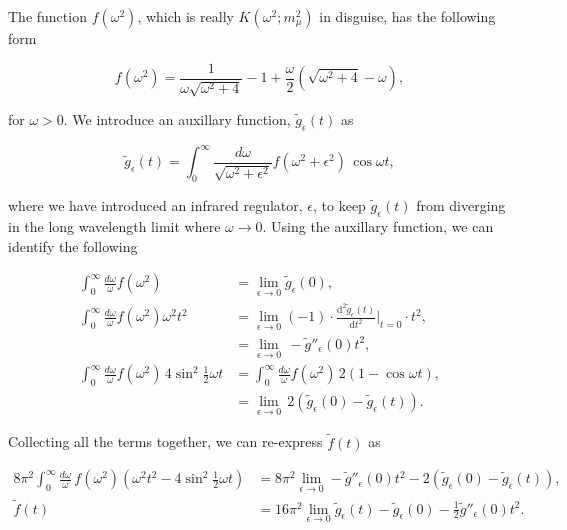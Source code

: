 \documentclass{article}
\numberwithin{equation}{section} %
\begin{document}
The function $f(\omega^2)$, which is really $K(\omega^2;m_\mu^2)$ in disguise, has the following form 

\begin{equation}
f(\omega^2) = \frac{1}{\omega\sqrt{\omega^2 + 4}} - 1 + \frac{\omega}{2}(\sqrt{\omega^2 + 4} - \omega),
\end{equation}

\noindent for $\omega>0$. We introduce an auxillary function, $\tilde{g}_\epsilon(t)$ as 

\begin{equation}
\tilde{g}_\epsilon(t) = \int^\infty_0 \frac{d\omega}{\sqrt{\omega^2 + \epsilon^2}} f(\omega^2 + \epsilon^2)\, \cos \omega t,
\label{aux func}
\end{equation}

\noindent where we have introduced an infrared regulator, $\epsilon$, to keep $\tilde{g}_\epsilon(t)$ from diverging in the long wavelength limit where $\omega\rightarrow 0$. Using the auxillary function, we can identify the following

\begin{equation}
\begin{split}
\int^\infty_0 \frac{d\omega}{\omega} f(\omega^2) &= \lim_{\epsilon\rightarrow 0} \tilde{g}_\epsilon(0),\\
\int^\infty_0 \frac{d\omega}{\omega} f(\omega^2)\omega^2 t^2 &= \lim_{\epsilon\rightarrow 0} (-1)\cdot\frac{\mathrm{d}^2\tilde{g}_\epsilon(t)}{\mathrm{d}t^2}\bigg\vert_{t=0} \cdot t^2,\\
&=\lim_{\epsilon\rightarrow 0} \, - \tilde{g}''_\epsilon(0)t^2,\\
\int^\infty_0 \frac{d\omega}{\omega} f(\omega^2)\,4 \sin^2 \frac{1}{2}\omega t &= \int^\infty_0 \frac{d\omega}{\omega} f(\omega^2)\,2(1- \cos\omega t) ,\\ 
&= \lim_{\epsilon\rightarrow 0}\, 2(\tilde{g}_\epsilon(0)-\tilde{g}_\epsilon(t)).
\end{split}
\end{equation}

\noindent Collecting all the terms together, we can re-express $\tilde{f}(t)$ as 

\begin{equation}
\begin{split}
8\pi^2\int^\infty_0 \frac{d\omega}{\omega}\, f(\omega^2)(\omega^2 t^2 - 4 \sin^2 \frac{1}{2}\omega t) &= 8\pi^2 \lim_{\epsilon\rightarrow 0} - \tilde{g}''_\epsilon(0)t^2 - 2(\tilde{g}_\epsilon(0)-\tilde{g}_\epsilon(t)),\\
\tilde{f}(t)&= 16\pi^2 \lim_{\epsilon\rightarrow 0}\tilde{g}_\epsilon(t) - \tilde{g}_\epsilon(0) - \frac{1}{2} \tilde{g}''_\epsilon(0)t^2.
\end{split}
\label{ftilde}
\end{equation}
\end{document}

